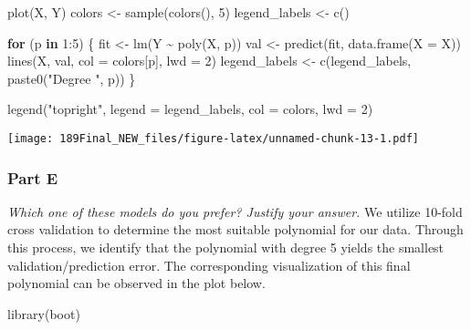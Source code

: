 \documentclass[
]{article}
\newenvironment{Shaded}{\begin{snugshade}}{\end{snugshade}}
\newcommand{\AttributeTok}[1]{\textcolor[rgb]{0.77,0.63,0.00}{#1}}
\newcommand{\ControlFlowTok}[1]{\textcolor[rgb]{0.13,0.29,0.53}{\textbf{#1}}}
\newcommand{\DecValTok}[1]{\textcolor[rgb]{0.00,0.00,0.81}{#1}}
\newcommand{\FunctionTok}[1]{\textcolor[rgb]{0.00,0.00,0.00}{#1}}
\newcommand{\NormalTok}[1]{#1}
\newcommand{\OtherTok}[1]{\textcolor[rgb]{0.56,0.35,0.01}{#1}}
\newcommand{\SpecialCharTok}[1]{\textcolor[rgb]{0.00,0.00,0.00}{#1}}
\newcommand{\StringTok}[1]{\textcolor[rgb]{0.31,0.60,0.02}{#1}}
\begin{document}
\begin{Shaded}
\begin{Highlighting}[]
\FunctionTok{plot}\NormalTok{(X, Y)}
\NormalTok{colors }\OtherTok{\textless{}{-}} \FunctionTok{sample}\NormalTok{(}\FunctionTok{colors}\NormalTok{(), }\DecValTok{5}\NormalTok{)}
\NormalTok{legend\_labels }\OtherTok{\textless{}{-}} \FunctionTok{c}\NormalTok{()}

\ControlFlowTok{for}\NormalTok{ (p }\ControlFlowTok{in} \DecValTok{1}\SpecialCharTok{:}\DecValTok{5}\NormalTok{) \{}
\NormalTok{  fit }\OtherTok{\textless{}{-}} \FunctionTok{lm}\NormalTok{(Y }\SpecialCharTok{\textasciitilde{}} \FunctionTok{poly}\NormalTok{(X, p))}
\NormalTok{  val }\OtherTok{\textless{}{-}} \FunctionTok{predict}\NormalTok{(fit, }\FunctionTok{data.frame}\NormalTok{(}\AttributeTok{X =}\NormalTok{ X))}
  \FunctionTok{lines}\NormalTok{(X, val, }\AttributeTok{col =}\NormalTok{ colors[p], }\AttributeTok{lwd =} \DecValTok{2}\NormalTok{)}
\NormalTok{  legend\_labels }\OtherTok{\textless{}{-}} \FunctionTok{c}\NormalTok{(legend\_labels, }\FunctionTok{paste0}\NormalTok{(}\StringTok{"Degree "}\NormalTok{, p))}
\NormalTok{\}}

\FunctionTok{legend}\NormalTok{(}\StringTok{"topright"}\NormalTok{, }\AttributeTok{legend =}\NormalTok{ legend\_labels, }\AttributeTok{col =}\NormalTok{ colors, }\AttributeTok{lwd =} \DecValTok{2}\NormalTok{)}
\end{Highlighting}
\end{Shaded}

\texttt{[image: 189Final\_NEW\_files/figure-latex/unnamed-chunk-13-1.pdf]}

\hypertarget{part-e-1}{%
\subsubsection{Part E}\label{part-e-1}}

\emph{Which one of these models do you prefer? Justify your answer.} We
utilize 10-fold cross validation to determine the most suitable
polynomial for our data. Through this process, we identify that the
polynomial with degree 5 yields the smallest validation/prediction
error. The corresponding visualization of this final polynomial can be
observed in the plot below.

\begin{Shaded}
\begin{Highlighting}[]
\FunctionTok{library}\NormalTok{(boot)}
\end{Highlighting}
\end{Shaded}
\end{document}

